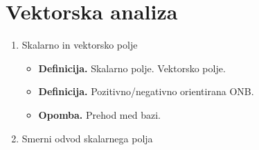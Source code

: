 \section{Vektorska analiza}
\begin{enumerate}
    \item Skalarno in vektorsko polje    
    \begin{itemize}
        \item \textbf{Definicija.} Skalarno polje. Vektorsko polje.
        \item \textbf{Definicija.} Pozitivno/negativno orientirana ONB.
        \item \textbf{Opomba.} Prehod med bazi.
    \end{itemize}

    \item Smerni odvod skalarnega polja
    

\end{enumerate}
